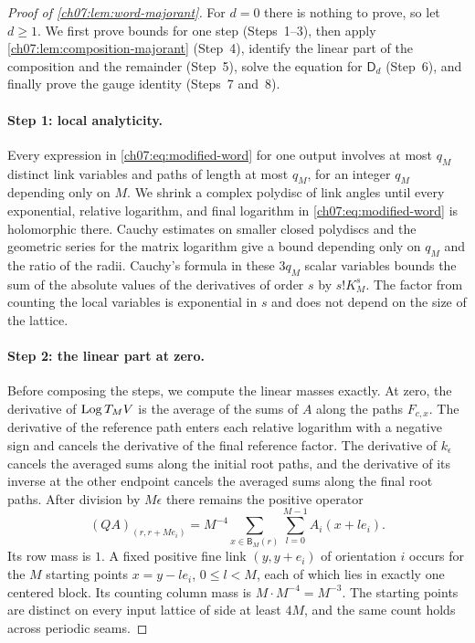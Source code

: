 \begin{proof}[Proof of \cref{ch07:lem:word-majorant}]
For $d=0$ there is nothing to prove, so let $d\ge1$. We first prove bounds for one step (Steps~1--3), then apply \cref{ch07:lem:composition-majorant} (Step~4), identify the linear part of the composition and the remainder (Step~5), solve the equation for $\mathsf D_d$ (Step~6), and finally prove the gauge identity (Steps~7 and~8).

\paragraph{Step 1: local analyticity.}
Every expression in \eqref{ch07:eq:modified-word} for one output involves at most $q_M$ distinct link variables and paths of length at most $q_M$, for an integer $q_M$ depending only on $M$. We shrink a complex polydisc of link angles until every exponential, relative logarithm, and final logarithm in \eqref{ch07:eq:modified-word} is holomorphic there. Cauchy estimates on smaller closed polydiscs and the geometric series for the matrix logarithm give a bound depending only on $q_M$ and the ratio of the radii. Cauchy's formula in these $3q_M$ scalar variables bounds the sum of the absolute values of the derivatives of order $s$ by $s!K_M^s$. The factor from counting the local variables is exponential in $s$ and does not depend on the size of the lattice.

\paragraph{Step 2: the linear part at zero.}
Before composing the steps, we compute the linear masses exactly. At zero, the derivative of $\operatorname{Log} T_MV$ is the average of the sums of $A$ along the paths $F_{c,x}$. The derivative of the reference path enters each relative logarithm with a negative sign and cancels the derivative of the final reference factor. The derivative of $k_\epsilon$ cancels the averaged sums along the initial root paths, and the derivative of its inverse at the other endpoint cancels the averaged sums along the final root paths. After division by $M\epsilon$ there remains the positive operator
\begin{equation}\label{ch07:eq:positive-Q}
 (QA)_{(r,r+Me_i)}=M^{-4}\sum_{x\in\mathsf B_M(r)}\sum_{l=0}^{M-1}A_i(x+le_i).
\end{equation}
Its row mass is $1$. A fixed positive fine link $(y,y+e_i)$ of orientation $i$ occurs for the $M$ starting points $x=y-le_i$, $0\le l<M$, each of which lies in exactly one centered block. Its counting column mass is $M\cdot M^{-4}=M^{-3}$. The starting points are distinct on every input lattice of side at least $4M$, and the same count holds across periodic seams.


\end{proof}
